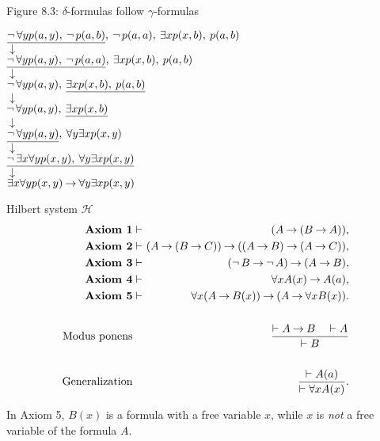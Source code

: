 \documentclass[style=simple,size=12pt]{powerdot}
\begin{document}
\begin{wideslide}[bm=,toc=]{Figure 8.3: $\delta$-formulas
follow $\gamma$-formulas}
\begin{center}
$\underline{\mathop{\neg} \forall y p(a,y),\: \mathop{\neg} p(a,b)},\:
\mathop{\neg} p(a,a),\: \exists xp(x,b),\: p(a,b)$ \\
$\downarrow$ \\
$\underline{\mathop{\neg} \forall y p(a,y),\: \mathop{\neg} p(a,a)},\:
  \exists xp(x,b),\: p(a,b)$ \\
$\downarrow$ \\
$\mathop{\neg} \forall y p(a,y),\:
\underline{\exists xp(x,b),\: p(a,b)}$ \\
$\downarrow$ \\
$\mathop{\neg} \forall y p(a,y),\:
\underline{\exists xp(x,b)}$ \\
$\downarrow$ \\
$\underline{\mathop{\neg} \forall y p(a,y)},\: \forall y \exists xp(x,y)$ \\
$\downarrow$ \\
$\underline{\mathop{\neg} \exists x \forall y p(x,y)
,\: \forall y \exists xp(x,y)}$ \\
$\downarrow$ \\
$\exists x \forall y p(x,y) \mathbin{\rightarrow} \forall y \exists xp(x,y)$ \\
\end{center}
\end{wideslide}

\begin{wideslide}[bm=,toc=]{Hilbert system $\mathcal{H}$}
\vspace*{-2ex}
\begin{eqnarray*}
\textrm{\bf Axiom 1} & \vdash \!\!\!\! & (A\imp(B\imp A)),\\
\textrm{\bf Axiom 2} & \vdash \!\!\!\! & (A\imp (B \imp C))  \imp ((A\imp B) \imp
(A\imp C)),\\
\textrm{\bf Axiom 3} & \vdash \!\!\!\! & (\ngg B \imp \ngg A) \imp (A \imp
B),\\
\textrm{\bf Axiom 4} & \vdash \!\!\!\! &\forall xA(x) \imp A(a),\\
\textrm{\bf Axiom 5} & \vdash \!\!\!\! &\forall x(A \imp B(x)) \imp
(A \imp \forall xB(x)).\\
\\
\textrm{Modus ponens} & &\frac{\vdash A \imp B\hspace{1em}\vdash
A}{\vdash B}\\
\\
\textrm{Generalization} && \frac{\vdash A(a)}{\vdash \forall xA(x)}.
\end{eqnarray*}

In Axiom 5, $B(x)$  is a formula with a free variable $x$,
while $x$ is \emph{not} a free variable of the formula $A$.
\end{wideslide}
\end{document}
